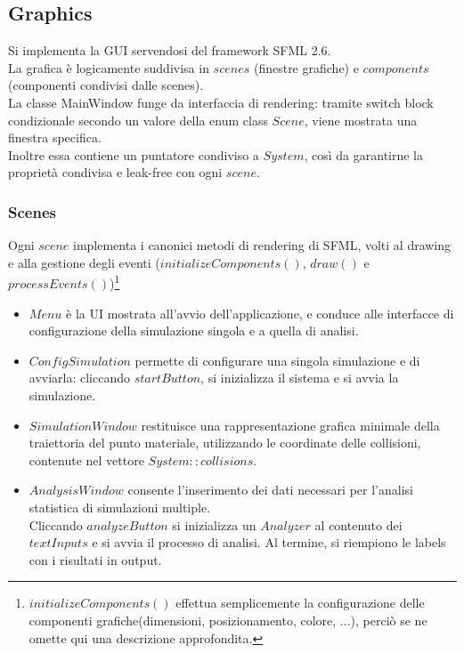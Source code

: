 \documentclass{article}
\begin{document}
\subsection{Graphics}
Si implementa la GUI servendosi del framework SFML 2.6.\\
La grafica è logicamente suddivisa in $scenes$ (finestre grafiche) e $components$ (componenti condivisi dalle scenes).\\
La classe MainWindow funge da interfaccia di rendering: tramite switch block condizionale secondo un valore della enum class $Scene$, viene mostrata una finestra specifica.\\
Inoltre essa contiene un puntatore condiviso a $System$, così da garantirne la proprietà condivisa e leak-free con ogni $scene$.

\subsubsection{Scenes}
Ogni $scene$ implementa i canonici metodi di rendering di SFML, volti al drawing e alla gestione degli eventi ($initializeComponents()$, $draw()$ e $processEvents()$)\footnote{$initializeComponents()$ effettua semplicemente la configurazione delle componenti grafiche(dimensioni, posizionamento, colore, ...), perciò se ne omette qui una descrizione approfondita.}

\begin{itemize}
    \item $Menu$ è la UI mostrata all'avvio dell'applicazione, e conduce alle interfacce di configurazione della simulazione singola e a quella di analisi.
    \item $ConfigSimulation$ permette di configurare una singola simulazione e di avviarla: cliccando $startButton$, si inizializza il sistema e si avvia la simulazione.
    \item $SimulationWindow$ restituisce una rappresentazione grafica minimale della traiettoria del punto materiale, utilizzando le coordinate delle collisioni, contenute nel vettore $System::collisions$.
    \item $AnalysisWindow$ consente l'inserimento dei dati necessari per l'analisi statistica di simulazioni multiple. \\ Cliccando $analyzeButton$ si inizializza un $Analyzer$ al contenuto dei $textInputs$ e si avvia il processo di analisi. Al termine, si riempiono le labels con i risultati in output.
\end{itemize}
\end{document}
